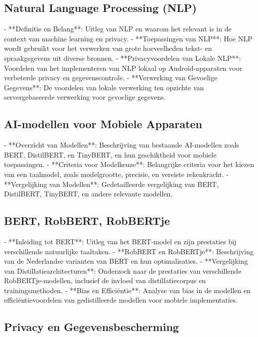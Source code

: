 \subsection{Natural Language Processing (NLP)}

- **Definitie en Belang**: Uitleg van NLP en waarom het relevant is in de context van machine learning en privacy.
- **Toepassingen van NLP**: Hoe NLP wordt gebruikt voor het verwerken van grote hoeveelheden tekst- en spraakgegevens uit diverse bronnen.
- **Privacyvoordelen van Lokale NLP**: Voordelen van het implementeren van NLP lokaal op Android-apparaten voor verbeterde privacy en gegevenscontrole.
- **Verwerking van Gevoelige Gegevens**: De voordelen van lokale verwerking ten opzichte van servergebaseerde verwerking voor gevoelige gegevens.

\subsection{ AI-modellen voor Mobiele Apparaten}

- **Overzicht van Modellen**: Beschrijving van bestaande AI-modellen zoals BERT, DistilBERT, en TinyBERT, en hun geschiktheid voor mobiele toepassingen.
- **Criteria voor Modelkeuze**: Belangrijke criteria voor het kiezen van een taalmodel, zoals modelgrootte, precisie, en vereiste rekenkracht.
- **Vergelijking van Modellen**: Gedetailleerde vergelijking van BERT, DistilBERT, TinyBERT, en andere relevante modellen.

\subsection{ BERT, RobBERT, RobBERTje}

- **Inleiding tot BERT**: Uitleg van het BERT-model en zijn prestaties bij verschillende natuurlijke taaltaken.
- **RobBERT en RobBERTje**: Beschrijving van de Nederlandse varianten van BERT en hun optimalisaties.
- **Vergelijking van Distillatiearchitecturen**: Onderzoek naar de prestaties van verschillende RobBERTje-modellen, inclusief de invloed van distillatiecorpus en trainingsmethoden.
- **Bias en Efficiëntie**: Analyse van bias in de modellen en efficiëntievoordelen van gedistilleerde modellen voor mobiele implementaties.

\subsection{Privacy en Gegevensbescherming}

